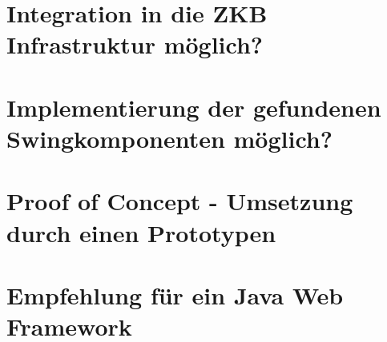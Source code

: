 \documentclass[
11pt, %
a4paper, %
BCOR25mm, %
DIV14, %
footsepline = false, %
headsepline, %
twoside, %
openright,
abstracton, %
listof=totocnumbered, %
bibliography=totocnumbered %
]{scrreprt}
\begin{document}
   
  
  \cleardoublepage
  
   
  \chapter{Integration in die ZKB Infrastruktur
  möglich?}\label{chapter:IntegrationInDieZkbInfrastrukutr}
  
  

  \cleardoublepage

   
  \chapter{Implementierung der gefundenen Swingkomponenten
  möglich?}\label{chapter:ImplementierungDerGefundenenSwingkomponenten}
  
  

  \cleardoublepage
  
  
  \chapter{Proof of Concept - Umsetzung durch einen
  Prototypen}\label{chapter:ProofOfConcept}
  
  

  \cleardoublepage  
  
   
  \chapter{Empfehlung für ein Java Web
  Framework}\label{chapter:EmpfehlungFuerEinJavaWebFramework}
  
\end{document}
